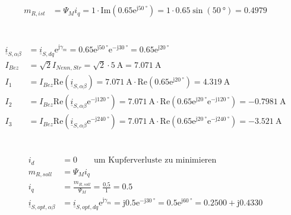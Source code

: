 \documentclass[11pt,a4paper]{scrartcl}
\newcommand{\mybr}[1]{\left(#1\right)}
\renewcommand{\j}{\mathrm{j}}
\renewcommand{\i}{\underline{i}}
\newcommand{\0}{_{\mybr{0}}}
\newcommand{\1}{_{\mybr{1}}}
\newcommand{\2}{_{\mybr{2}}}
\renewcommand{\e}{\mathrm{e}}
\renewcommand{\Re}{\mathrm{Re}}
\renewcommand{\Im}{\mathrm{Im}}
\newcommand{\isab}{\i_{S,\alpha\beta}}
\newcommand{\isdq}{\i_{S,dq}}
\begin{document}
\section{}
\begin{align}
m_{R,ist}&=\Psi_M i_q=1\cdot\Im\mybr{\num{0.65}\e^{\j\SI{50}{\degree}}}=1\cdot\num{0.65}\sin\mybr{\SI{50}{\degree}}=\num{0.4979}
\end{align}
\section{}
\begin{align}
\isab&=\isdq\e^{\j\gamma_m}=\num{0.65}\e^{\j\SI{50}{\degree}}\e^{-\j\SI{30}{\degree}}=\num{0.65}\e^{\j\SI{20}{\degree}}\\
I_{Bez}&=\sqrt{2}I_{Nenn,Str}=\sqrt{2}\cdot\SI{5}{\ampere}=\SI{7.071}{\ampere}\\
I_1&=I_{Bez}\Re\mybr{\isab}=\SI{7.071}{\ampere}\cdot\Re\mybr{\num{0.65}\e^{\j\SI{20}{\degree}}}=\SI{4.319}{\ampere}\\
I_2&=I_{Bez}\Re\mybr{\isab\e^{-\j\SI{120}{\degree}}}=\SI{7.071}{\ampere}\cdot\Re\mybr{\num{0.65}\e^{\j\SI{20}{\degree}}\e^{-\j\SI{120}{\degree}}}=\SI{-0.7981}{\ampere}\\
I_3&=I_{Bez}\Re\mybr{\isab\e^{-\j\SI{240}{\degree}}}=\SI{7.071}{\ampere}\cdot\Re\mybr{\num{0.65}\e^{\j\SI{20}{\degree}}\e^{-\j\SI{240}{\degree}}}=\SI{-3.521}{\ampere}
\end{align}

\section{}
\begin{align}
i_d&=0\quad\quad\text{um Kupferverluste zu minimieren}\\
m_{R,soll}&=\Psi_M i_q\\
i_q&=\frac{m_{R,soll}}{\Psi_M}=\frac{\num{0.5}}{1}=\num{0.5}\\
\i_{S,opt,\alpha\beta}&=\i_{S,opt,dq}\e^{\j\gamma_m}=\j\num{0.5}\e^{-\j\SI{30}{\degree}}=\num{0.5}\e^{\j\SI{60}{\degree}}=\num{0.2500}+\j\num{0.4330}
\end{align}
\end{document}
